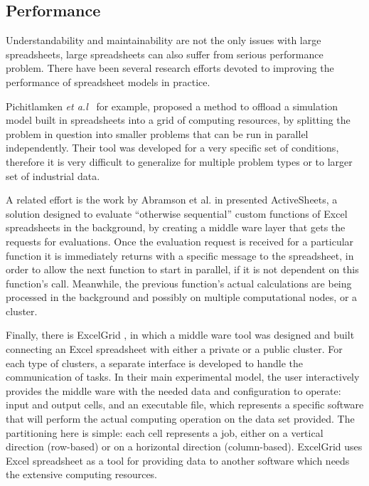 \documentclass[conference]{IEEEtran}
\begin{document}

\subsection{Performance}
Understandability and maintainability are not the only issues with large spreadsheets, large spreadsheets can also suffer from serious performance problem. There have been several research efforts devoted to improving the performance of spreadsheet models in practice.

Pichitlamken \emph{et a.l}~\cite{7_pichitlamken_kajkamhaeng_uthayopas_kaewpuang_2010} for example, proposed a method to offload a simulation model built in spreadsheets into a grid of computing resources, by splitting the problem in question into smaller problems that can be run in parallel independently. Their tool was developed for a very specific set of conditions, therefore it is very difficult to generalize for multiple problem types or to larger set of industrial data. 

A related effort is the work by Abramson et al. in \cite{6_abramson_roe_kotler_mather_2001} presented ActiveSheets, a solution designed to evaluate “otherwise sequential” custom functions of Excel spreadsheets in the background, by creating a middle ware layer that gets the requests for evaluations. Once the evaluation request is received for a particular function it is immediately returns with a specific message to the spreadsheet, in order to allow the next function to start in parallel, if it is not dependent on this function's call. Meanwhile, the previous function's actual calculations are being processed in the background and possibly on multiple computational nodes, or a cluster. 

Finally, there is ExcelGrid \cite{10_nadiminti_chiu_teoh_luther_venugopal_buyya_2004}, in which a middle ware tool was designed and built connecting an Excel spreadsheet with either a private or a public cluster. For each type of clusters, a separate interface is developed to handle the communication of tasks. In their main experimental model, the user interactively provides the middle ware with the needed data and configuration to operate: input and output cells, and an executable file, which represents a specific software that will perform the actual computing operation on the data set provided. The partitioning here is simple: each cell represents a job, either on a vertical direction (row-based) or on a horizontal direction (column-based). ExcelGrid uses Excel spreadsheet as a tool for providing data to another software which needs the extensive computing resources. 
\end{document}
